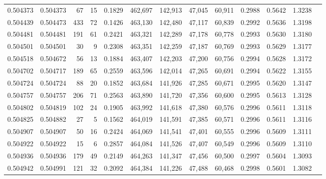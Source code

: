 \begin{tabular}{rrrrrrrrrrrrr}
0.504373 & 0.504373 &    67 &    15 &                                     0.1829 & 462,697 & 142,913 &  47,045 &  60,911 & 0.2988 & 0.5642 & 1.3238 \\
0.504439 & 0.504473 &   433 &    72 &                                     0.1426 & 463,130 & 142,480 &  47,117 &  60,839 & 0.2992 & 0.5636 & 1.3198 \\
0.504481 & 0.504481 &   191 &    61 &                                     0.2421 & 463,321 & 142,289 &  47,178 &  60,778 & 0.2993 & 0.5630 & 1.3180 \\
0.504501 & 0.504501 &    30 &     9 &                                     0.2308 & 463,351 & 142,259 &  47,187 &  60,769 & 0.2993 & 0.5629 & 1.3177 \\
0.504518 & 0.504672 &    56 &    13 &                                     0.1884 & 463,407 & 142,203 &  47,200 &  60,756 & 0.2994 & 0.5628 & 1.3172 \\
0.504702 & 0.504717 &   189 &    65 &                                     0.2559 & 463,596 & 142,014 &  47,265 &  60,691 & 0.2994 & 0.5622 & 1.3155 \\
0.504724 & 0.504724 &    88 &    20 &                                     0.1852 & 463,684 & 141,926 &  47,285 &  60,671 & 0.2995 & 0.5620 & 1.3147 \\
0.504757 & 0.504757 &   206 &    71 &                                     0.2563 & 463,890 & 141,720 &  47,356 &  60,600 & 0.2995 & 0.5613 & 1.3128 \\
0.504802 & 0.504819 &   102 &    24 &                                     0.1905 & 463,992 & 141,618 &  47,380 &  60,576 & 0.2996 & 0.5611 & 1.3118 \\
0.504825 & 0.504882 &    27 &     5 &                                     0.1562 & 464,019 & 141,591 &  47,385 &  60,571 & 0.2996 & 0.5611 & 1.3116 \\
0.504907 & 0.504907 &    50 &    16 &                                     0.2424 & 464,069 & 141,541 &  47,401 &  60,555 & 0.2996 & 0.5609 & 1.3111 \\
0.504922 & 0.504922 &    15 &     6 &                                     0.2857 & 464,084 & 141,526 &  47,407 &  60,549 & 0.2996 & 0.5609 & 1.3110 \\
0.504936 & 0.504936 &   179 &    49 &                                     0.2149 & 464,263 & 141,347 &  47,456 &  60,500 & 0.2997 & 0.5604 & 1.3093 \\
0.504942 & 0.504991 &   121 &    32 &                                     0.2092 & 464,384 & 141,226 &  47,488 &  60,468 & 0.2998 & 0.5601 & 1.3082 \\

\end{tabular}
